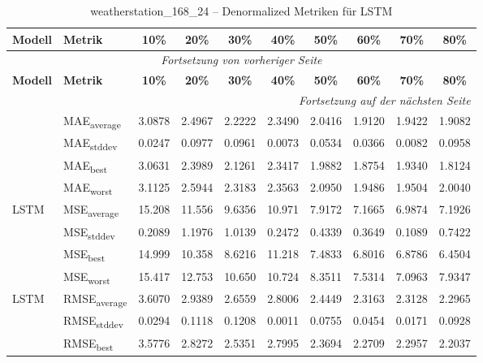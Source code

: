 {\small
\begin{longtable}{l l c c c c c c c c}
    \toprule
    \textbf{Modell} & \textbf{Metrik} & \textbf{10\%} & \textbf{20\%} & \textbf{30\%} & \textbf{40\%} & \textbf{50\%} & \textbf{60\%} & \textbf{70\%} & \textbf{80\%} \\
    \midrule
    \endfirsthead
    \multicolumn{10}{c}{\textit{Fortsetzung von vorheriger Seite}} \\
    \toprule
    \textbf{Modell} & \textbf{Metrik} & \textbf{10\%} & \textbf{20\%} & \textbf{30\%} & \textbf{40\%} & \textbf{50\%} & \textbf{60\%} & \textbf{70\%} & \textbf{80\%} \\
    \midrule
    \endhead
    \midrule
    \multicolumn{10}{r}{\textit{Fortsetzung auf der nächsten Seite}} \\
    \midrule
    \endfoot
    \bottomrule
    \caption{weatherstation_168_24 -- Denormalized Metriken für LSTM}
    \label{tab:weatherstation_168_24_denormalized_lstm}
    \endlastfoot
\multirow{4}{*}{LSTM} & MAE\textsubscript{average} & 3.0878 & 2.4967 & 2.2222 & 2.3490 & 2.0416 & 1.9120 & 1.9422 & 1.9082 \\
 & MAE\textsubscript{stddev} & 0.0247 & 0.0977 & 0.0961 & 0.0073 & 0.0534 & 0.0366 & 0.0082 & 0.0958 \\
 & MAE\textsubscript{best} & 3.0631 & 2.3989 & 2.1261 & 2.3417 & 1.9882 & 1.8754 & 1.9340 & 1.8124 \\
 & MAE\textsubscript{worst} & 3.1125 & 2.5944 & 2.3183 & 2.3563 & 2.0950 & 1.9486 & 1.9504 & 2.0040 \\
\cmidrule(lr){2-10}
\multirow{4}{*}{LSTM} & MSE\textsubscript{average} & 15.208 & 11.556 & 9.6356 & 10.971 & 7.9172 & 7.1665 & 6.9874 & 7.1926 \\
 & MSE\textsubscript{stddev} & 0.2089 & 1.1976 & 1.0139 & 0.2472 & 0.4339 & 0.3649 & 0.1089 & 0.7422 \\
 & MSE\textsubscript{best} & 14.999 & 10.358 & 8.6216 & 11.218 & 7.4833 & 6.8016 & 6.8786 & 6.4504 \\
 & MSE\textsubscript{worst} & 15.417 & 12.753 & 10.650 & 10.724 & 8.3511 & 7.5314 & 7.0963 & 7.9347 \\
\cmidrule(lr){2-10}
\multirow{4}{*}{LSTM} & RMSE\textsubscript{average} & 3.6070 & 2.9389 & 2.6559 & 2.8006 & 2.4449 & 2.3163 & 2.3128 & 2.2965 \\
 & RMSE\textsubscript{stddev} & 0.0294 & 0.1118 & 0.1208 & 0.0011 & 0.0755 & 0.0454 & 0.0171 & 0.0928 \\
 & RMSE\textsubscript{best} & 3.5776 & 2.8272 & 2.5351 & 2.7995 & 2.3694 & 2.2709 & 2.2957 & 2.2037 \\

\end{longtable}}
